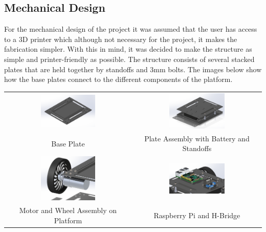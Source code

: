 \documentclass[12pt, letterpaper,titlepage]{article}
\begin{document}
	\subsection{Mechanical Design}

	For the mechanical design of the project it was assumed that the user has access to a 3D printer which although not necessary for the project, it makes the fabrication simpler. With this in mind, it was decided to make the structure as simple and printer-friendly as possible. The structure consists of several stacked plates that are held together by standoffs and 3mm bolts. The images below show how the base plates connect to the different components of the platform.
	
	\begin{tabular}{ c c }
		\includegraphics[width=0.45\textwidth]{plate.png} & \includegraphics[width=0.45\textwidth]{plate_assembly.png} \\
		Base Plate & Plate Assembly with Battery and Standoffs \\
		\includegraphics[width=0.45\textwidth]{motort.png} & \includegraphics[width=0.45\textwidth]{pi.png}\\
		Motor and Wheel Assembly on Platform & Raspberry Pi and H-Bridge
	\end{tabular}
\end{document}
